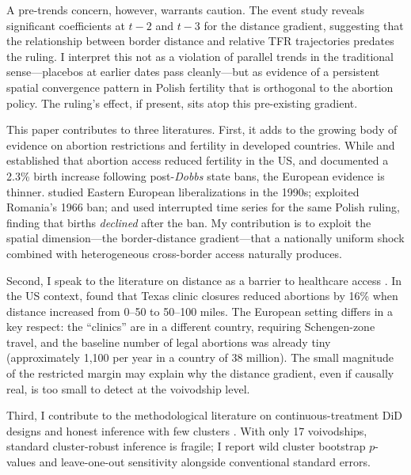 \documentclass[12pt]{article}
\begin{document}
A pre-trends concern, however, warrants caution. The event study reveals significant coefficients at $t-2$ and $t-3$ for the distance gradient, suggesting that the relationship between border distance and relative TFR trajectories predates the ruling. I interpret this not as a violation of parallel trends in the traditional sense---placebos at earlier dates pass cleanly---but as evidence of a persistent spatial convergence pattern in Polish fertility that is orthogonal to the abortion policy. The ruling's effect, if present, sits atop this pre-existing gradient.

This paper contributes to three literatures. First, it adds to the growing body of evidence on abortion restrictions and fertility in developed countries. While \citet{myers2017} and \citet{ananat2007} established that abortion access reduced fertility in the US, and \citet{dench2024} documented a 2.3\% birth increase following post-\textit{Dobbs} state bans, the European evidence is thinner. \citet{levine2004} studied Eastern European liberalizations in the 1990s; \citet{popeleches2006} exploited Romania's 1966 ban; and \citet{matysiak2025} used interrupted time series for the same Polish ruling, finding that births \textit{declined} after the ban. My contribution is to exploit the spatial dimension---the border-distance gradient---that a nationally uniform shock combined with heterogeneous cross-border access naturally produces.

Second, I speak to the literature on distance as a barrier to healthcare access \citep{lindo2020, venator2021, myers2024}. In the US context, \citet{lindo2020} found that Texas clinic closures reduced abortions by 16\% when distance increased from 0--50 to 50--100 miles. The European setting differs in a key respect: the ``clinics'' are in a different country, requiring Schengen-zone travel, and the baseline number of legal abortions was already tiny (approximately 1,100 per year in a country of 38 million). The small magnitude of the restricted margin may explain why the distance gradient, even if causally real, is too small to detect at the voivodship level.

Third, I contribute to the methodological literature on continuous-treatment DiD designs \citep{callaway2021, goodmanbacon2021} and honest inference with few clusters \citep{cameron2015, mackinnon2023}. With only 17 voivodships, standard cluster-robust inference is fragile; I report wild cluster bootstrap $p$-values and leave-one-out sensitivity alongside conventional standard errors.
\end{document}

